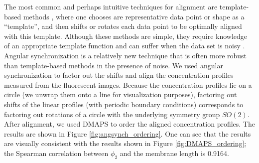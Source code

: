 \documentclass[10pt]{article}
\begin{document}
The most common and perhaps intuitive techniques for alignment are template-based methods \cite{ahuja2007template}, where one chooses are representative data point or shape as a ``template'', and then shifts or rotates each data point to be optimally aligned with this template.
%
Although these methods are simple, they require knowledge of an appropriate template function and can suffer when the data set is noisy \cite{sonday2013noisy}.
%
Angular synchronization \cite{singer2011angular} is a relatively new technique that is often more robust than template-based methods in the presence of noise.
%
We used angular synchronization to factor out the shifts and align the concentration profiles measured from the fluorescent images.
%
Because the concentration profiles lie on a circle (we unwrap them onto a line for visualization purposes), factoring out shifts of the linear profiles (with periodic boundary conditions) corresponds to factoring out rotations of a circle with the underlying symmetry group $SO(2)$. 
%
After alignment, we used DMAPS to order the aligned concentration profiles.
%
The results are shown in Figure \ref{fig:angsynch_ordering}.
%
One can see that the results are visually consistent with the results shown in Figure \ref{fig:DMAPS_ordering}; the Spearman correlation between $\phi_2$ and the membrane length is 0.9164. 
\end{document}

